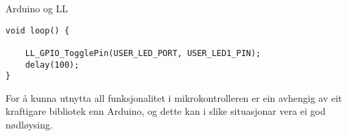 \begin{frame}[containsverbatim]{Arduino og LL}
	
	\begin{verbatim}
void loop() {
	
	LL_GPIO_TogglePin(USER_LED_PORT, USER_LED1_PIN);
	delay(100);
}
	\end{verbatim}
	
	For å kunna utnytta all funksjonalitet i mikrokontrolleren er ein avhengig av eit kraftigare bibliotek enn Arduino, og dette kan i slike situasjonar vera ei god nødløysing.
	
\end{frame}